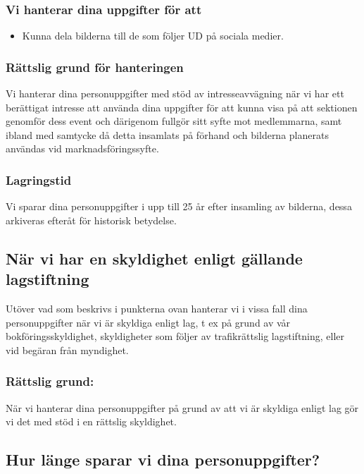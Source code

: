 \documentclass[a4paper]{article}
\begin{document}
\subsubsection{Vi hanterar dina uppgifter för att}
\begin{itemize}
    \item Kunna dela bilderna till de som följer UD på sociala medier.
\end{itemize}

\subsubsection{Rättslig grund för hanteringen}

Vi hanterar dina personuppgifter med stöd av intresseavvägning när vi har ett
berättigat intresse att använda dina uppgifter för att kunna visa på att sektionen genomför
dess event och därigenom fullgör sitt syfte mot medlemmarna, samt ibland med
samtycke då detta insamlats på förhand och bilderna planerats användas vid
marknadsföringssyfte.

\subsubsection{Lagringstid}
Vi sparar dina personuppgifter i upp till 25 år efter insamling av bilderna, dessa arkiveras
efteråt för historisk betydelse.



\subsection{När vi har en skyldighet enligt gällande lagstiftning}

Utöver vad som beskrivs i punkterna ovan hanterar vi i vissa fall dina personuppgifter
när vi är skyldiga enligt lag, t ex på grund av vår bokföringsskyldighet, skyldigheter som
följer av trafikrättslig lagstiftning, eller vid begäran från myndighet.

\subsubsection{Rättslig grund:}
När vi hanterar dina personuppgifter på grund av att vi är skyldiga enligt lag gör vi det
med stöd i en rättslig skyldighet.

\subsection{Hur länge sparar vi dina personuppgifter?}
\end{document}
